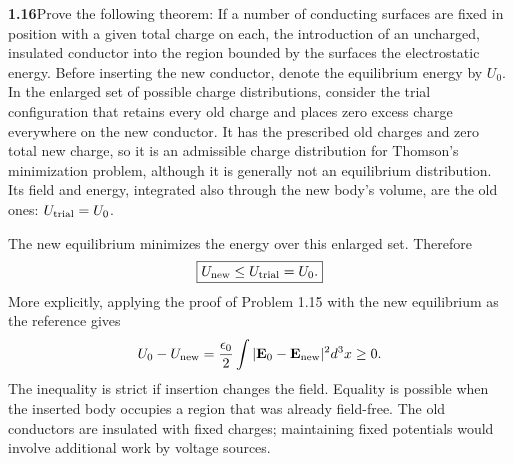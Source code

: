 \par\bigskip
\noindent\textbf{1.16}\quad Prove the following theorem: If a number of conducting surfaces are fixed in position with a given total charge on each, the introduction of an uncharged, insulated conductor into the region bounded by the surfaces  the electrostatic energy. 
\solution
Before inserting the new conductor, denote the equilibrium energy by $U_0$.
In the enlarged set of possible charge distributions, consider the trial
configuration that retains every old charge and places zero excess charge
everywhere on the new conductor. It has the prescribed old charges and zero
total new charge, so it is an admissible charge distribution for Thomson's
minimization problem, although it is generally not an equilibrium distribution.
Its field and energy, integrated also through the new body's volume, are the
old ones: $U_{\rm trial}=U_0$.

The new equilibrium minimizes the energy over this enlarged set. Therefore
\[
\boxed{U_{\rm new}\le U_{\rm trial}=U_0.}
\]
More explicitly, applying the proof of Problem 1.15 with the new equilibrium
as the reference gives
\[
U_0-U_{\rm new}=\frac{\epsilon_0}{2}
\int|\mathbf E_0-\mathbf E_{\rm new}|^2d^3x\ge0.
\]
The inequality is strict if insertion changes the field. Equality is possible
when the inserted body occupies a region that was already field-free.
The old conductors are insulated with fixed charges; maintaining fixed
potentials would involve additional work by voltage sources.


